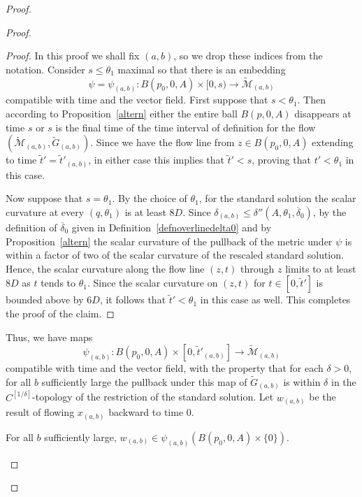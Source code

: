 \begin{proof}
\begin{proof}
\begin{proof}
In this proof we shall fix $(a,b)$, so we drop these indices from
the notation.
 Consider
$s\le \theta_1$ maximal so that there is an embedding
$$\psi=\psi_{(a,b)}\colon
B(p_0,0,A)\times [0,s)\to \widetilde{\mathcal
M}_{(a,b)}$$ compatible with time and the vector field. First
suppose that $s<\theta_1$. Then according to
Proposition~\ref{altern} either the entire ball $B(p,0,A)$
disappears at time $s$ or $s$ is the final time of the
time interval of definition for the flow $(\widetilde{\mathcal
M}_{(a,b)},\widetilde G_{(a,b)})$. Since we have the flow line from $z\in
B(p_0,0,A)$ extending to time $\tilde t'=\tilde t'_{(a,b)}$, in either case this
implies that $\tilde t'<s$, proving that $t'<\theta_1$ in this case.

Now suppose that $s=\theta_1$. By the choice of
$\theta_1$, for the standard solution  the scalar curvature at every
$(q,\theta_1)$ is at least $8D$. Since
$\delta_{(a,b)}\le \delta''(A,\theta_1,\overline\delta_0)$, by the
definition of $\overline\delta_0$ given in
Definition~\ref{defnoverlinedelta0} and by Proposition~\ref{altern}
the scalar curvature of the pullback of the metric under  $\psi$ is
within a factor of two of the scalar curvature of the rescaled
standard solution. Hence, the scalar curvature along the flow line
$(z,t)$ through $z$ limits to at least
$8D$ as $t$ tends to $\theta_1$.
Since the scalar curvature on $(z,t)$ for $t\in [0,\tilde t']$ is
bounded above by $6D$, it follows that $\tilde t'<\theta_1$ in this case as
well. This completes the proof of the
claim.
\end{proof}


Thus, we have maps
$$\psi_{(a,b)}\colon B(p_0,0,A)\times [0,\tilde t'_{(a,b)}]\to \widetilde {\mathcal M}_{(a,b)}$$
compatible with time and the vector field, with the property that for each $\delta>0$, for
all $b$ sufficiently large the pullback under this map of $\widetilde G_{(a,b)}$ is within $\delta$
in the $C^{[1/\delta]}$-topology of the restriction of the standard solution.
Let $w_{(a,b)}$ be the result of flowing $x_{(a,b)}$ backward to time $0$.

\begin{claim}
\label{claim:w-ab-in-ball-image}
For all $b$ sufficiently large, $w_{(a,b)}\in \psi_{(a,b)}(B(p_0,0,A)\times\{0\})$.
\end{claim}


\end{proof}
\end{proof}
